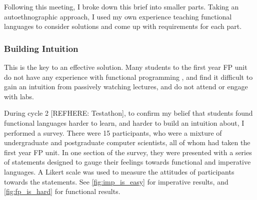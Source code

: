 Following this meeting, I broke down this brief into smaller parts. Taking an autoethnographic approach, I used my own experience teaching functional languages to consider solutions and come up with requirements for each part. 

\subsubsection{Building Intuition}
\label{building_intuition}
This is the key to an effective solution. Many students to the first year \ac{FP}  unit do not have any experience with functional programming , and find it difficult to gain an intuition from passively watching lectures, and do not attend or engage with labs. 

During cycle 2  [REFHERE: Testathon], to confirm my belief that students found functional languages harder to learn, and harder to build an intuition about, I performed a survey. There were 15 participants, who were a mixture of undergraduate and postgraduate computer scientists, all of whom had taken the first year \ac{FP} unit. In one section of the survey, they were presented with a series of statements designed to gauge their feelings towards functional and imperative languages. A Likert scale\cite{likert1932technique} was used to measure the attitudes of participants towards the statements. See \ref{fig:imp_is_easy} for imperative results, and \ref{fig:fp_is_hard} for functional results. 

